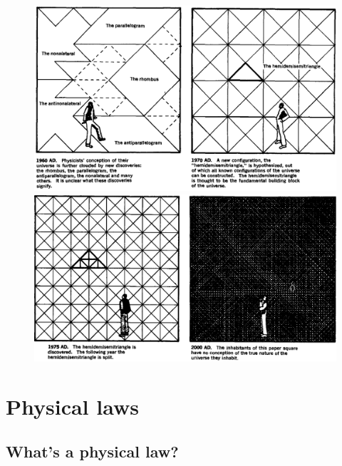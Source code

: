 \documentclass[a4paper,12pt,%
onecolumn,oneside,%
british%
]{memoir}
\renewcommand*{\|}[1][]{\nonscript\:#1\vert\nonscript\:\mathopen{}}
\begin{document}
\begin{figure}[p]
  \centering
  \includegraphics[width=1.2\linewidth]{images/chew3.png}
\\[1em]  \includegraphics[width=1.2\linewidth]{images/chew4.png}
  \label{fig:chew2}
\end{figure}

\newpage

\section{Physical laws}
\label{sec:phys_laws0}

\subsection{What's a physical law?}
\end{document}
